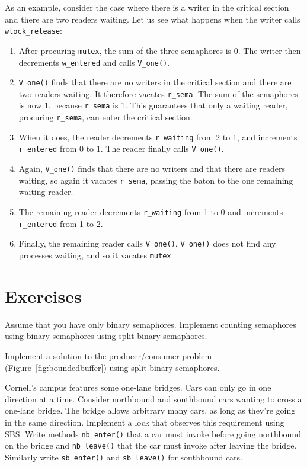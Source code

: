 \documentclass{report}
\begin{document}
As an example, consider the case where there is a writer in the critical
section and there are two readers waiting.  Let us see what happens when
the writer calls \texttt{wlock\_release}:
\begin{enumerate}
\item After procuring \texttt{mutex},
the sum of the three semaphores is 0.  The writer then decrements
\texttt{w\_entered} and calls \texttt{V\_one()}.
\item \texttt{V\_one()} finds that there are no writers in the critical section
and there are two readers waiting.  It therefore vacates \texttt{r\_sema}.
The sum of the semaphores is now 1, because \texttt{r\_sema} is 1.  This
guarantees that only a waiting reader, procuring \texttt{r\_sema}, can enter
the critical section.
\item When it does, the reader decrements \texttt{r\_waiting}
from 2 to 1, and increments \texttt{r\_entered} from 0 to 1.
The reader finally calls \texttt{V\_one()}.
\item Again, \texttt{V\_one()} finds that there are no writers and
that there are readers waiting, so again it vacates \texttt{r\_sema},
passing the baton to the one remaining waiting reader.
\item The remaining reader decrements \texttt{r\_waiting} from 1 to 0 and
increments \texttt{r\_entered} from 1 to 2.
\item Finally, the remaining reader  calls \texttt{V\_one()}.
\texttt{V\_one()} does not find any processes waiting,
and so it vacates \texttt{mutex}.
\end{enumerate}

\section*{Exercises}
\begin{problems}
\item Assume that you have only binary semaphores.
Implement counting semaphores using binary semaphores using split binary semaphores.
\item Implement a solution to the producer/consumer problem
(Figure~\ref{fig:boundedbuffer}) using split binary semaphores.
\item \label{ex:onelane} Cornell's campus features some one-lane bridges.
Cars can only go in one direction at a time. Consider northbound
and southbound cars wanting to cross a one-lane bridge.
The bridge allows arbitrary many cars, as long as they're going in the
same direction.
Implement a lock that observes this requirement using SBS.  Write methods
\texttt{nb\_enter()} that a car must invoke before going northbound on
the bridge and \texttt{nb\_leave()} that the car must invoke after leaving
the bridge.  Similarly write \texttt{sb\_enter()} and \texttt{sb\_leave()}
for southbound cars.

\end{problems}
\end{document}
